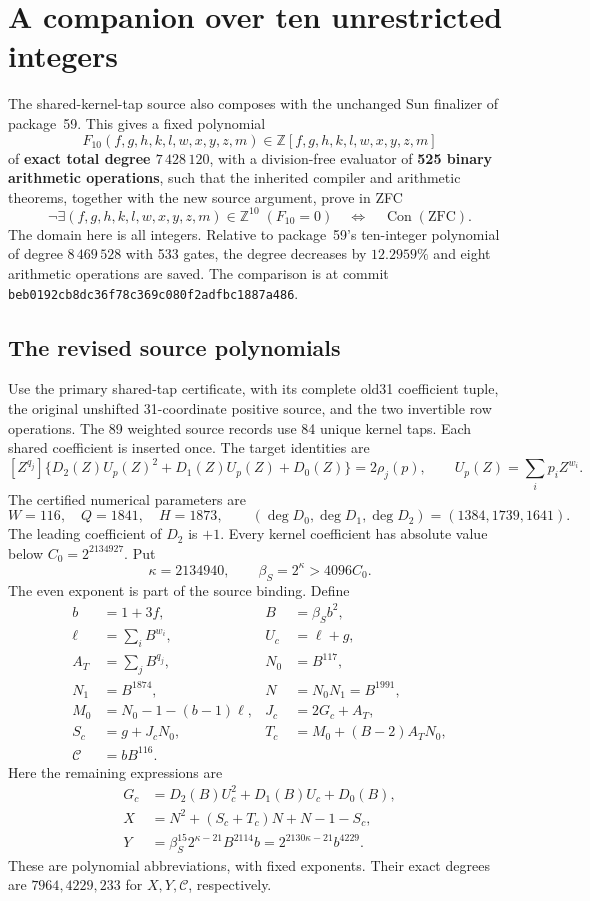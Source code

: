 \section{A companion over ten unrestricted integers}
\label{sec:shared-tap-sun}

The shared-kernel-tap source also composes with the unchanged Sun finalizer
of package~59. This gives a fixed polynomial
\[
 F_{10}(f,g,h,k,l,w,x,y,z,m)\in\mathbb Z[f,g,h,k,l,w,x,y,z,m]
\]
of \textbf{exact total degree $7\,428\,120$}, with a division-free evaluator
of \textbf{525 binary arithmetic operations}, such that the inherited
compiler and arithmetic theorems, together with the new source argument,
prove in ZFC
\[
 \neg\exists(f,g,h,k,l,w,x,y,z,m)\in\mathbb Z^{10}\;(F_{10}=0)
 \quad\Longleftrightarrow\quad\operatorname{Con}(\mathrm{ZFC}).
\]
The domain here is all integers. Relative to package~59's ten-integer
polynomial of degree $8\,469\,528$ with 533 gates, the degree decreases by
$12.2959\%$ and eight arithmetic operations are saved. The comparison is
at commit \texttt{beb0192cb8dc36f78c369c080f2adfbc1887a486}.

\subsection{The revised source polynomials}

Use the primary shared-tap certificate, with its complete old31 coefficient
tuple, the original unshifted 31-coordinate positive source, and the two
invertible row operations. The 89 weighted source records use 84 unique
kernel taps. Each shared coefficient is inserted once. The target identities
are
\[
 [Z^{q_j}]\{D_2(Z)U_p(Z)^2+D_1(Z)U_p(Z)+D_0(Z)\}
       =2\rho_j(p),\qquad U_p(Z)=\sum_i p_iZ^{w_i}.
\]
The certified numerical parameters are
\[
 W=116,\quad Q=1841,\quad H=1873,\qquad
 (\deg D_0,\deg D_1,\deg D_2)=(1384,1739,1641).
\]
The leading coefficient of $D_2$ is $+1$. Every kernel coefficient has
absolute value below $C_0=2^{2134927}$. Put
\[
 \kappa=2134940,\qquad \beta_S=2^\kappa>4096C_0.
\]
The even exponent is part of the source binding. Define
\begin{align*}
 b&=1+3f,& B&=\beta_Sb^2,\\
 \ell&=\sum_iB^{w_i},& U_c&=\ell+g,\\
 A_T&=\sum_jB^{q_j},&N_0&=B^{117},\\
 N_1&=B^{1874},&N&=N_0N_1=B^{1991},\\
 M_0&=N_0-1-(b-1)\ell,&J_c&=2G_c+A_T,\\
 S_c&=g+J_cN_0,&T_c&=M_0+(B-2)A_TN_0,\\
 \mathcal C&=bB^{116}.
\end{align*}
Here the remaining expressions are
\begin{align*}
 G_c&=D_2(B)U_c^2+D_1(B)U_c+D_0(B),\\
 X&=N^2+(S_c+T_c)N+N-1-S_c,\\
 Y&=\beta_S^{15}2^{\kappa-21}B^{2114}b
     =2^{2130\kappa-21}b^{4229}.
\end{align*}
These are polynomial abbreviations, with fixed exponents. Their exact
degrees are $7964,4229,233$ for $X,Y,\mathcal C$, respectively.

